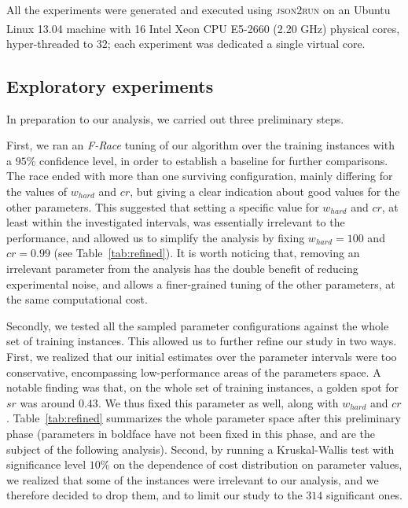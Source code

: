 \documentclass[authoryear,12pt]{article}
\begin{document}
All the experiments were generated and executed using \textsc{json2run}
\citep{Urli13} on an Ubuntu Linux 13.04 machine with 16
Intel\textsuperscript{\textregistered} Xeon\textsuperscript{\textregistered} CPU
E5-2660 (2.20 GHz) physical cores, hyper-threaded to 32; each experiment was
dedicated a single virtual core.

\subsection{Exploratory experiments}

In preparation to our analysis, we carried out three preliminary steps.

First, we ran an \emph{F-Race} tuning \citep{BYBS10} of our algorithm over the
training instances with a $95\%$ confidence level, in order to establish a
baseline for further comparisons. The race ended with more than one surviving
configuration, mainly differing for the values of $w_{hard}$ and $cr$, but
giving a clear indication about good values for the other parameters.  This
suggested that setting a specific value for $w_{hard}$ and $cr$, at least within
the investigated intervals, was essentially irrelevant to the performance, and
allowed us to simplify the analysis by fixing $w_{hard} = 100$ and $cr = 0.99$
(see Table~\ref{tab:refined}).  It is worth noticing that, removing an
irrelevant parameter from the analysis has the double benefit of reducing
experimental noise, and allows a finer-grained tuning of the other parameters,
at the same computational cost.

Secondly, we tested all the sampled parameter configurations against the whole set
of training instances. This allowed us to further refine our study in two ways.
First, we realized that our initial estimates over the parameter intervals were
too conservative, encompassing low-performance areas of the parameters space. A
notable finding was that, on the whole set of training instances, a golden spot
for $sr$ was around $0.43$. We thus fixed this parameter as well, along with
$w_{hard}$ and $cr$. Table~\ref{tab:refined} summarizes the whole parameter
space after this preliminary phase (parameters in boldface have not been fixed
in this phase, and are the subject of the following analysis). Second, by
running a Kruskal-Wallis test \citep[see][]{HoWD2013} with significance level
$10\%$ on the dependence of cost distribution on parameter values, we realized
that some of the instances were irrelevant to our analysis, and we therefore
decided to drop them, and to limit our study to the $314$ significant ones.
\end{document}
